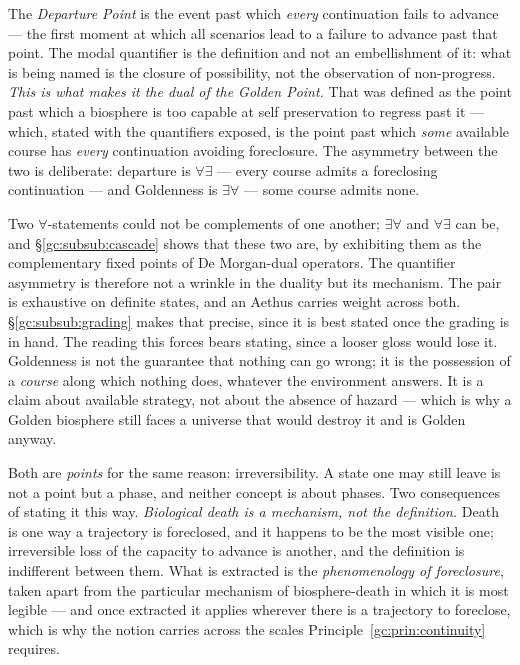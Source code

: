 \begin{definition}\label{gc:def:departure}
The \emph{Departure Point} is the event past which \emph{every}
continuation fails to advance --- the first moment at which all
scenarios lead to a failure to advance past that point. The modal
quantifier is the definition and not an embellishment of it: what is
being named is the closure of possibility, not the observation of
non-progress. \emph{This is what makes it the dual of the Golden Point.} That was
defined as the point past which a biosphere is too capable at self
preservation to regress past it --- which, stated with the quantifiers
exposed, is the point past which \emph{some} available course has
\emph{every} continuation avoiding foreclosure. The asymmetry between
the two is deliberate: departure is $\forall\exists$ --- every course
admits a foreclosing continuation --- and Goldenness is
$\exists\forall$ --- some course admits none.

Two $\forall$-statements could not be complements of one another;
$\exists\forall$ and $\forall\exists$ can be, and
\S\ref{gc:subsub:cascade} shows that these two are, by exhibiting them
as the complementary fixed points of De Morgan-dual operators. The
quantifier asymmetry is therefore not a wrinkle in the duality but its
mechanism. The pair is exhaustive on definite states, and an Aethus carries weight
across both. \S\ref{gc:subsub:grading} makes that precise, since it is
best stated once the grading is in hand. The reading this forces bears stating, since a looser gloss
would lose it. Goldenness is not the guarantee that nothing can go
wrong; it is the possession of a \emph{course} along which nothing
does, whatever the environment answers. It is a claim about available
strategy, not about the absence of hazard --- which is why a Golden
biosphere still faces a universe that would destroy it and is Golden
anyway.

Both are \emph{points} for the same reason: irreversibility. A state
one may still leave is not a point but a phase, and neither concept is
about phases. Two consequences of stating it this way. \emph{Biological death is a mechanism, not the definition.} Death is one
way a trajectory is foreclosed, and it happens to be the most visible
one; irreversible loss of the capacity to advance is another, and the
definition is indifferent between them. What is extracted is the
\emph{phenomenology of foreclosure}, taken apart from the particular
mechanism of biosphere-death in which it is most legible --- and once
extracted it applies wherever there is a trajectory to foreclose,
which is why the notion carries across the scales
Principle~\ref{gc:prin:continuity} requires.


\end{definition}
